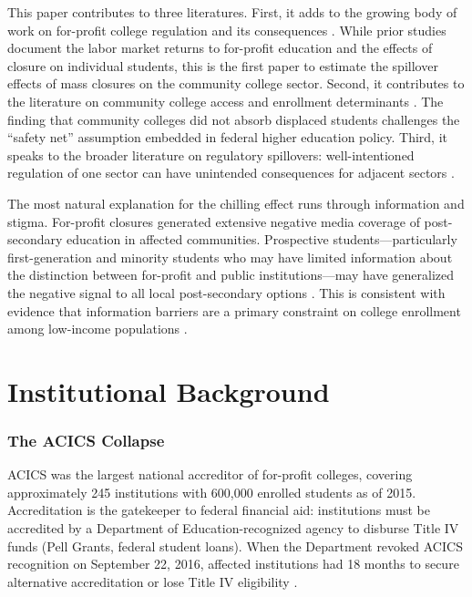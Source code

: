 \documentclass[12pt]{article}
\begin{document}
This paper contributes to three literatures. First, it adds to the growing body of work on for-profit college regulation and its consequences \citep{DemingEtAl2012,Cellini2010,CelliniChaudhary2014,DaroliaEtAl2015}. While prior studies document the labor market returns to for-profit education and the effects of closure on individual students, this is the first paper to estimate the spillover effects of mass closures on the community college sector. Second, it contributes to the literature on community college access and enrollment determinants \citep{KaneRouse1999,Bound2010,Dynarski2003}. The finding that community colleges did not absorb displaced students challenges the ``safety net'' assumption embedded in federal higher education policy. Third, it speaks to the broader literature on regulatory spillovers: well-intentioned regulation of one sector can have unintended consequences for adjacent sectors \citep{Greenstone2002,RyanGoldberg2014}.

The most natural explanation for the chilling effect runs through information and stigma. For-profit closures generated extensive negative media coverage of post-secondary education in affected communities. Prospective students---particularly first-generation and minority students who may have limited information about the distinction between for-profit and public institutions---may have generalized the negative signal to all local post-secondary options \citep{Hoxby2015,Dynarski2018}. This is consistent with evidence that information barriers are a primary constraint on college enrollment among low-income populations \citep{BettsLagsdonMcFarland2000,Hoxby2013}.

\section{Institutional Background}

\subsubsection*{The ACICS Collapse} ACICS was the largest national accreditor of for-profit colleges, covering approximately 245 institutions with 600,000 enrolled students as of 2015. Accreditation is the gatekeeper to federal financial aid: institutions must be accredited by a Department of Education-recognized agency to disburse Title IV funds (Pell Grants, federal student loans). When the Department revoked ACICS recognition on September 22, 2016, affected institutions had 18 months to secure alternative accreditation or lose Title IV eligibility \citep{DoED2016}.
\end{document}
